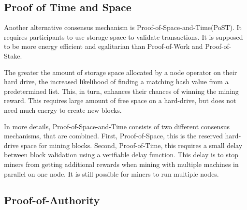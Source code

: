 \subsection{Proof of Time and Space}\label{subsec:proof-of-time-and-space}
Another alternative consensus mechanism is Proof-of-Space-and-Time(PoST).
It requires participants to use storage space to validate transactions.
It is supposed to be more energy efficient and egalitarian than Proof-of-Work and Proof-of-Stake.

The greater the amount of storage space allocated by a node operator on their hard drive, the increased likelihood of finding a matching hash value from a predetermined list.
This, in turn, enhances their chances of winning the mining reward.
This requires large amount of free space on a hard-drive, but does not need much energy to create new blocks.

In more details, Proof-of-Space-and-Time consists of two different consensus mechanisms, that are combined.
First, Proof-of-Space, this is the reserved hard-drive space for mining blocks.
Second, Proof-of-Time, this requires a small delay between block validation using a verifiable delay function.
This delay is to stop miners from getting additional rewards when mining with multiple machines in parallel on one node.
It is still possible for miners to run multiple nodes.\cite{supraoracles-post}


\subsection{Proof-of-Authority}\label{subsec:proof-of-authority}

